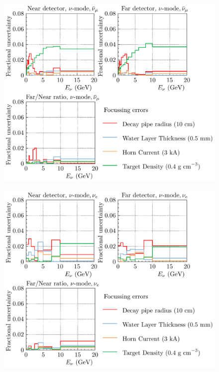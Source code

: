 \documentclass{article}
\begin{document}
\begin{figure}
  \includegraphics[width=\textwidth]{plots/fracerrs/numode_numubar_Focussing}
  \caption{}
  \label{fig:foc_nu_numubar}
\end{figure}

\begin{figure}
  \includegraphics[width=\textwidth]{plots/fracerrs/numode_nue_Focussing}
  \caption{}
  \label{fig:foc_nu_nue}
\end{figure}
\end{document}
